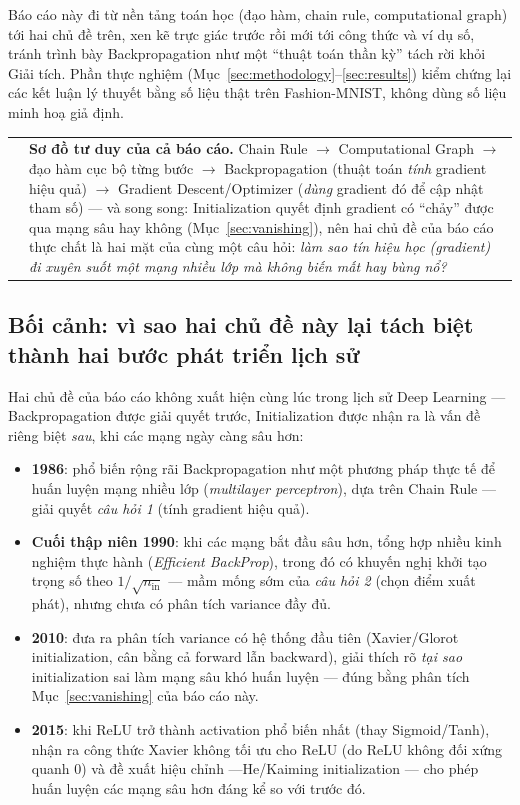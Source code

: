 \documentclass[12pt,a4paper]{report}
\makeatletter
\newenvironment{tructiep}[1][Cách hiểu đơn giản]
  {\par\smallskip\noindent\begin{tabular}{@{}p{0.35em}@{\hspace{6pt}}p{\dimexpr\linewidth-1.9em\relax}@{}}
   \textcolor{boxln}{\rule{2pt}{\baselineskip}} & \textbf{#1.}\enspace\ignorespaces}
  {\end{tabular}\par\smallskip}
\newcommand{\en}[1]{\textit{#1}}
\makeatother
\begin{document}
Báo cáo này đi từ nền tảng toán học (đạo hàm, chain rule, computational
graph) tới hai chủ đề trên, xen kẽ trực giác trước rồi mới tới công thức và
ví dụ số, tránh trình bày Backpropagation như một ``thuật toán thần kỳ''
tách rời khỏi Giải tích. Phần thực nghiệm (Mục~\ref{sec:methodology}--\ref{sec:results})
kiểm chứng lại các kết luận lý thuyết bằng số liệu thật trên Fashion-MNIST,
không dùng số liệu minh hoạ giả định.

\begin{tructiep}[Sơ đồ tư duy của cả báo cáo]
Chain Rule $\to$ Computational Graph $\to$ đạo hàm cục bộ từng bước $\to$
Backpropagation (thuật toán \emph{tính} gradient hiệu quả) $\to$ Gradient
Descent/Optimizer (\emph{dùng} gradient đó để cập nhật tham số) --- và song
song: Initialization quyết định gradient có ``chảy'' được qua mạng sâu hay
không (Mục~\ref{sec:vanishing}), nên hai chủ đề của báo cáo thực chất là
hai mặt của cùng một câu hỏi: \emph{làm sao tín hiệu học (gradient) đi
xuyên suốt một mạng nhiều lớp mà không biến mất hay bùng nổ?}
\end{tructiep}

\subsection*{Bối cảnh: vì sao hai chủ đề này lại tách biệt thành hai bước
phát triển lịch sử}

Hai chủ đề của báo cáo không xuất hiện cùng lúc trong lịch sử Deep
Learning --- Backpropagation được giải quyết trước, Initialization được
nhận ra là vấn đề riêng biệt \emph{sau}, khi các mạng ngày càng sâu hơn:

\begin{itemize}
\item \textbf{1986}: \citet{rumelhart1986learning} phổ biến rộng rãi
  Backpropagation như một phương pháp thực tế để huấn luyện mạng nhiều
  lớp (\en{multilayer perceptron}), dựa trên Chain Rule --- giải quyết
  \emph{câu hỏi 1} (tính gradient hiệu quả).
\item \textbf{Cuối thập niên 1990}: khi các mạng bắt đầu sâu hơn,
  \citet{lecun1998efficient} tổng hợp nhiều kinh nghiệm thực hành
  (\en{Efficient BackProp}), trong đó có khuyến nghị khởi tạo trọng số
  theo $1/\sqrt{n_{\text{in}}}$ --- mầm mống sớm của \emph{câu hỏi 2}
  (chọn điểm xuất phát), nhưng chưa có phân tích variance đầy đủ.
\item \textbf{2010}: \citet{glorot2010understanding} đưa ra phân tích
  variance có hệ thống đầu tiên (Xavier/Glorot initialization, cân bằng
  cả forward lẫn backward), giải thích rõ \emph{tại sao} initialization
  sai làm mạng sâu khó huấn luyện --- đúng bằng phân tích
  Mục~\ref{sec:vanishing} của báo cáo này.
\item \textbf{2015}: khi ReLU trở thành activation phổ biến nhất (thay
  Sigmoid/Tanh), \citet{he2015delving} nhận ra công thức Xavier không tối
  ưu cho ReLU (do ReLU không đối xứng quanh $0$) và đề xuất hiệu chỉnh
  ---He/Kaiming initialization --- cho phép huấn luyện các mạng sâu hơn
  đáng kể so với trước đó.
\end{itemize}
\end{document}

